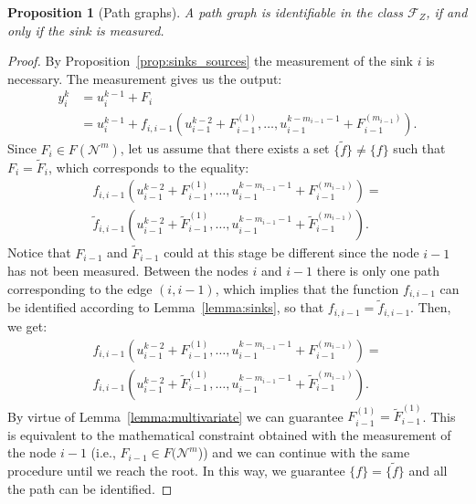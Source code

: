 \documentclass[letterpaper,10pt,journal]{IEEEtran}
\newcommand{\Fone}{\mathcal{F}_Z}
\newtheorem{proposition}{Proposition}
\newcommand{\NN}{\mathcal{N}}
\begin{document}
\begin{proposition}[Path graphs]\label{prop:paths_identifiability}
A path graph is identifiable in the class $\Fone$, if and only if the sink is measured.
\end{proposition}
\begin{proof}
    By Proposition~\ref{prop:sinks_sources} the measurement of the sink $i$ is necessary. The measurement gives us the output:
    \begin{align*}
        y_i^k&\!=\!u_i^{k-1}+F_i\\
        &\!=\!u_i^{k-1}\!+\!f_{i,i-1}(u_{i-1}^{k-2}\!+\!F_{i-1}^{(1)},\ldots,u_{i-1}^{k-m_{i-1}-1}\!+\!F_{i-1}^{(m_{i-1})}).
    \end{align*}
    Since $F_i\in F(\NN^m)$, let us assume that there exists a set $\{\tilde f\}\neq \{ f\}$ such that $F_i=\tilde F_i$, which corresponds to the equality:
    \begin{multline*}
        f_{i,i-1}(u_{i-1}^{k-2}+F_{i-1}^{(1)},\ldots,u_{i-1}^{k-m_{i-1}-1}+F_{i-1}^{(m_{i-1})})=\\
        \tilde f_{i,i-1}(u_{i-1}^{k-2}+\tilde F_{i-1}^{(1)},\ldots,u_{i-1}^{k-m_{i-1}-1}+\tilde F_{i-1}^{(m_{i-1})}).
    \end{multline*}
    Notice that $F_{i-1}$ and $\tilde F_{i-1}$ could at this stage be different since the node $i-1$ has not been measured.
    Between the nodes $i$ and $i-1$ there is only one path corresponding to the edge $(i,i-1)$, which implies that the function $f_{i,i-1}$ can be identified according to Lemma~\ref{lemma:sinks}, so that $f_{i,i-1}=\tilde f_{i,i-1}$. Then, we get:
    \begin{multline*}
        f_{i,i-1}(u_{i-1}^{k-2}+F_{i-1}^{(1)},\ldots,u_{i-1}^{k-m_{i-1}-1}+F_{i-1}^{(m_{i-1})})=\\
         f_{i,i-1}(u_{i-1}^{k-2}+\tilde F_{i-1}^{(1)},\ldots,u_{i-1}^{k-m_{i-1}-1}+\tilde F_{i-1}^{(m_{i-1})}).
    \end{multline*}
    By virtue of Lemma~\ref{lemma:multivariate} we can guarantee $F_{i-1}^{(1)}=\tilde F_{i-1}^{(1)}$. This is equivalent to the mathematical constraint obtained with the measurement of the node $i-1$
    (i.e., $F_{i-1}\in F(\NN^m$)) and we can continue with the same procedure until we reach the root. In this way, we guarantee $\{ f \}=\{ \tilde f \}$ and all the path can be identified.
\end{proof}
\end{document}
